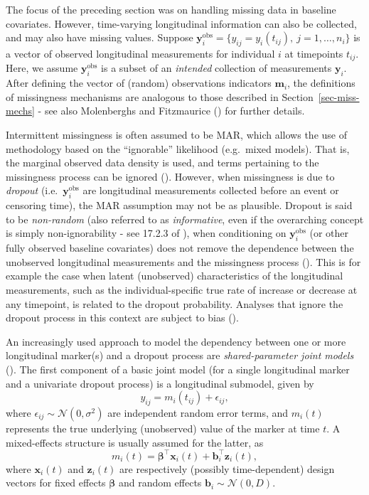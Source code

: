 \documentclass[
  letterpaper,
  paper=240mm:170mm,
  twoside=true,
  open=right,
  fontsize=10pt,
  pagesize=false,
  BCOR=15mm,
  DIV=14,
  headinclude=true,
  footinclude=false,
  headsepline=on]{scrbook}
\begin{document}
The focus of the preceding section was on handling missing data in
baseline covariates. However, time-varying longitudinal information can
also be collected, and may also have missing values. Suppose
\(\mathbf{y}_{i}^{\text{obs}} = \{y_{ij} = y_i(t_{ij}), \ j = 1,\ldots,n_i\}\)
is a vector of observed longitudinal measurements for individual \(i\)
at timepoints \(t_{ij}\). Here, we assume
\(\mathbf{y}_{i}^{\text{obs}}\) is a subset of an \emph{intended}
collection of measurements \(\mathbf{y}_{i}\). After defining the vector
of (random) observations indicators \(\mathbf{m}_{i}\), the definitions
of missingness mechanisms are analogous to those described in
Section~\ref{sec-miss-mechs} - see also Molenberghs and Fitzmaurice
() for
further details.

Intermittent missingness is often assumed to be MAR, which allows the
use of methodology based on the ``ignorable'' likelihood (e.g.~mixed
models). That is, the marginal observed data density is used, and terms
pertaining to the missingness process can be ignored
(). However, when missingness is due to \emph{dropout}
(i.e.~\(\mathbf{y}_{i}^{\text{obs}}\) are longitudinal measurements
collected before an event or censoring time), the MAR assumption may not
be as plausible. Dropout is said to be \emph{non-random} (also referred
to as \emph{informative}, even if the overarching concept is simply
non-ignorability - see 17.2.3 of
), when conditioning on
\(\mathbf{y}_{i}^{\text{obs}}\) (or other fully observed baseline
covariates) does not remove the dependence between the unobserved
longitudinal measurements and the missingness process
(). This is for example the case when latent
(unobserved) characteristics of the longitudinal measurements, such as
the individual-specific true rate of increase or decrease at any
timepoint, is related to the dropout probability. Analyses that ignore
the dropout process in this context are subject to bias
().

An increasingly used approach to model the dependency between one or
more longitudinal marker(s) and a dropout process are
\emph{shared-parameter joint models}
(). The first component of a basic joint model (for a single
longitudinal marker and a univariate dropout process) is a longitudinal
submodel, given by \[
y_{ij} = m_i(t_{ij}) + \epsilon_{ij},
\] where \(\epsilon_{ij} \sim \mathcal{N}(0, \sigma^2)\) are independent
random error terms, and \(m_i(t)\) represents the true underlying
(unobserved) value of the marker at time \(t\). A mixed-effects
structure is usually assumed for the latter, as \[
m_i(t) = \boldsymbol{\beta}^\top \mathbf{x}_i(t) + \boldsymbol{b}_i^\top \mathbf{z}_i(t),
\] where \(\mathbf{x}_i(t)\) and \(\mathbf{z}_i(t)\) are respectively
(possibly time-dependent) design vectors for fixed effects
\(\boldsymbol{\beta}\) and random effects
\(\boldsymbol{b}_i \sim \mathcal{N}(0, D)\).
\end{document}
